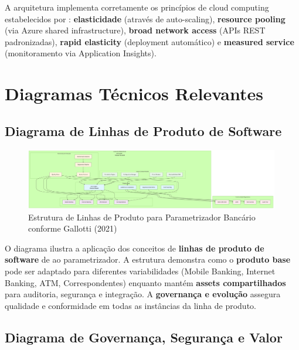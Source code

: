 A arquitetura implementa corretamente os princípios de cloud computing estabelecidos por : \textbf{elasticidade} (através de auto-scaling), \textbf{resource pooling} (via Azure shared infrastructure), \textbf{broad network access} (APIs REST padronizadas), \textbf{rapid elasticity} (deployment automático) e \textbf{measured service} (monitoramento via Application Insights).

\section{Diagramas Técnicos Relevantes}

\subsection{Diagrama de Linhas de Produto de Software}

\begin{figure}[h]
    \centering
    \includegraphics[width=0.99\textwidth]{figuras/v_008_01_linhas_produto_software.png} 
    \caption{Estrutura de Linhas de Produto para Parametrizador Bancário conforme Gallotti (2021)}
    \label{fig:v_008_01_linhas_produto_software}
\end{figure}

O diagrama ilustra a aplicação dos conceitos de \textbf{linhas de produto de software} de  ao parametrizador. A estrutura demonstra como o \textbf{produto base} pode ser adaptado para diferentes variabilidades (Mobile Banking, Internet Banking, ATM, Correspondentes) enquanto mantém \textbf{assets compartilhados} para auditoria, segurança e integração. A \textbf{governança e evolução} assegura qualidade e conformidade em todas as instâncias da linha de produto.

\subsection{Diagrama de Governança, Segurança e Valor}

